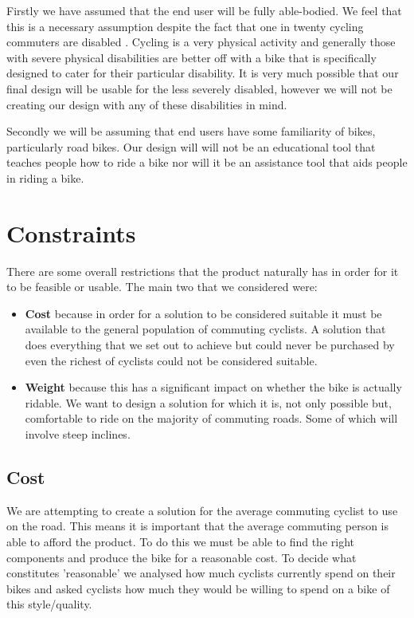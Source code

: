 \documentclass[]{report}
\begin{document}
Firstly we have assumed that the end user will be fully able-bodied. We feel that this is a necessary assumption despite the fact that one in twenty cycling commuters are disabled \citep{census-dis}. Cycling is a very physical activity and generally those with severe physical disabilities are better off with a bike that is specifically designed to cater for their particular disability. It is very much possible that our final design will be usable for the less severely disabled, however we will not be creating our design with any of these disabilities in mind.

Secondly we will be assuming that end users have some familiarity of bikes, particularly road bikes. Our design will will not be an educational tool that teaches people how to ride a bike nor will it be an assistance tool that aids people in riding a bike. 

\section{Constraints}
There are some overall restrictions that the product naturally has in order for it to be feasible or usable. The main two that we considered were:
\begin{itemize}
  \item \textbf{Cost} because in order for a solution to be considered suitable it must be available to the general population of commuting cyclists. A solution that does everything that we set out to achieve but could never be purchased by even the richest of cyclists could not be considered suitable.
  \item \textbf{Weight} because this has a significant impact on whether the bike is actually ridable. We want to design a solution for which it is, not only possible but, comfortable to ride on the majority of commuting roads. Some of which will involve steep inclines.  
\end{itemize}
\subsection{Cost}
We are attempting to create a solution for the average commuting cyclist to use on the road. This means it is important that the average commuting person is able to afford the product. To do this we must be able to find the right components and produce the bike for a reasonable cost. To decide what constitutes 'reasonable' we analysed how much cyclists currently spend on their bikes and asked cyclists how much they would be willing to spend on a bike of this style/quality.
\end{document}
